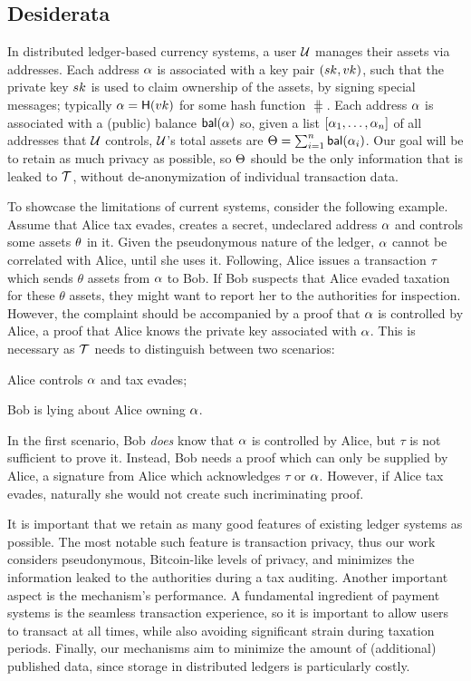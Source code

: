 \subsection{Desiderata}\label{sec:taxation}

In distributed ledger-based currency systems, a user $\mathcal{U}$ manages their
assets via addresses. Each address $\alpha$ is associated with a key pair
$(sk_{}, vk_{})$, such that the private key $sk$ is used to claim ownership of
the assets, \eg by signing special messages; typically $\alpha =
\mathsf{H}(vk)$ for some hash function $\hash$. Each address $\alpha$ is
associated with a (public) balance $\mathsf{bal}(\alpha)$ so, given a list
$[\alpha_1, \dots, \alpha_n]$ of all addresses that $\mathcal{U}$ controls,
$\mathcal{U}$'s total assets are $\Theta = \sum_{i=1}^n \mathsf{bal}(\alpha_i)$. Our
goal will be to retain as much privacy as possible, so $\Theta$ should be the
only information that is leaked to $\mathcal{T}$, without
de-anonymization of individual transaction data.

To showcase the limitations of current systems, consider the following example.
Assume that Alice tax evades, \ie creates a secret, undeclared address
$\alpha$ and controls some assets $\theta$ in it. Given the pseudonymous
nature of the ledger, $\alpha$ cannot be correlated with Alice, until she
uses it. Following, Alice issues a transaction $\tau$ which sends $\theta$
assets from $\alpha$ to Bob. If Bob suspects that Alice evaded taxation for
these $\theta$ assets, they might want to report her to the authorities for
inspection. However, the complaint should be accompanied by a proof that
$\alpha$ is controlled by Alice, \ie a proof that Alice knows the private key
associated with $\alpha$. This is necessary as $\mathcal{T}$ needs to
distinguish between two scenarios:
\begin{inparaenum}[i)]
    \item Alice controls $\alpha$ and tax evades;
    \item Bob is lying about Alice owning $\alpha$.
\end{inparaenum}
In the first scenario, Bob \emph{does} know that $\alpha$ is controlled by
Alice, but $\tau$ is not sufficient to prove it.
Instead, Bob needs a proof which can only be supplied by Alice, \eg a signature
from Alice which acknowledges $\tau$ or $\alpha$. However, if Alice tax
evades, naturally she would not create such incriminating proof.

It is important that we retain as many good features of existing ledger systems
as possible. The most notable such feature is transaction privacy, thus our
work considers pseudonymous, Bitcoin-like levels of privacy, and minimizes the
information leaked to the authorities during a tax auditing. Another important
aspect is the mechanism's performance. A fundamental ingredient of payment
systems is the seamless transaction experience, so it is important to allow
users to transact at all times, while also avoiding significant strain during
taxation periods. Finally, our mechanisms aim to minimize the amount of
(additional) published data, since storage in
distributed ledgers is particularly costly.

